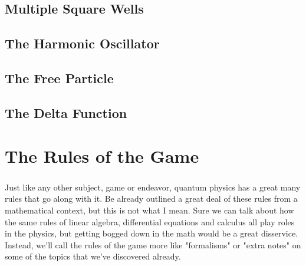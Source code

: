\documentclass[12pt,letterpaper]{book}
\begin{document}

\section{Multiple Square Wells}



\section{The Harmonic Oscillator}



\section{The Free Particle}


\section{The Delta Function}





\chapter{The Rules of the Game}

\paragraph*{}Just like any other subject, game or endeavor, quantum physics has a great many rules that go along with it. Be already outlined a great deal of these rules from a mathematical context, but this is not what I mean. Sure we can talk about how the same rules of linear algebra, differential equations and calculus all play roles in the physics, but getting bogged down in the math would be a great disservice. Instead, we'll call the rules of the game more like "formalisms" or "extra notes" on some of the topics that we've discovered already.
\end{document}

